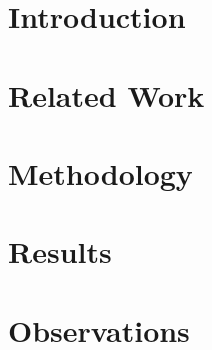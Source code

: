 
\usepackage{hyperref}
\usepackage{graphicx}
\usepackage{float}

\maketitle
\begin{abstract}
	
\end{abstract}
\section{Introduction}

\section{Related Work}

\section{Methodology}

\section{Results}

\section{Observations}

\IEEEpeerreviewmaketitle




